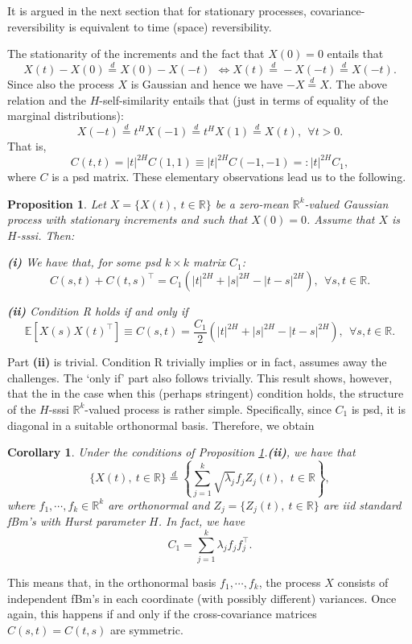 \documentclass[11pt]{article}
\def\E{\mathbb E}
\def\R{\mathbb R}
\def\eqd{\stackrel{d}{=}}
\theoremstyle{plain}
\newtheorem{corollary}[theorem]{Corollary}
\newtheorem{proposition}[theorem]{Proposition}
\theoremstyle{definition}
\theoremstyle{condition}
\theoremstyle{remark}
\begin{document}
It is argued in the next section that for stationary processes, covariance-reversibility is equivalent to time (space) reversibility.

\medskip
The stationarity of the increments and the fact that $X(0)=0$ entails that 
$$
X(t) - X(0) \eqd X(0) - X(-t) \ \ \Leftrightarrow X(t) \eqd -X(-t) \eqd X(-t).
$$
Since also the process $X$ is Gaussian and hence we have $-X\eqd X$.  The above relation and the
$H$-self-similarity entails that (just in terms of equality of the marginal distributions):
$$
X(-t) \eqd t^H X(-1) \eqd t^H X(1) \eqd X(t),\ \ \forall t>0. 
$$
That is, 
$$
C(t,t) = |t|^{2H} C(1,1) \equiv |t|^{2H} C(-1,-1) =: |t|^{2H} C_1,
$$
where $C$ is a psd matrix.  These elementary observations lead us to the following.

\begin{proposition}\label{p:basic} Let $X = \{X(t),\ t\in\R\}$ be a zero-mean $\R^k$-valued Gaussian process with stationary increments and such that $X(0)=0$.
Assume that $X$ is $H$-sssi.  Then:

{\bf (i)} We have that, for some psd $k\times k$ matrix $C_1$: 
$$
C(s,t) + C(t,s)^\top = C_1  \left( |t|^{2H} + | s|^{2H} - |t-s|^{2H} \right),\ \ \forall s,t\in\R.
$$

{\bf (ii)} Condition R holds if and only if
$$
\E [ X(s)X(t)^\top]  \equiv C(s,t) = \frac{C_1}{2}  \left( |t|^{2H} + | s|^{2H} - |t-s|^{2H} \right),\ \ \forall s,t\in\R.
$$
\end{proposition}

Part {\bf (ii)} is trivial. Condition R trivially implies or in fact, assumes away the challenges.  The `only if' part also follows trivially. This result 
shows, however, that the in the case when this (perhaps stringent) condition holds, the structure of the $H$-sssi $\R^k$-valued process is 
rather simple.  Specifically, since $C_1$ is psd, it is diagonal in a suitable orthonormal basis.  Therefore, we obtain

\begin{corollary} Under the conditions of Proposition \ref{p:basic}.{\bf (ii)}, we have that 
$$
\{X(t),\ t\in\R\} \eqd \left\{ \sum_{j=1}^k \sqrt{\lambda_j} f_j Z_j(t),\ \ t\in\R\right\},
$$
where $f_1,\cdots,f_k\in\R^k$ are orthonormal and $Z_j = \{Z_j(t),\ t\in\R\}$ are iid standard fBm's with Hurst parameter $H$.  In fact, we have
$$
C_1 = \sum_{j=1}^k \lambda_j f_j f_j^\top.
$$
\end{corollary}

This means that, in the orthonormal basis $f_1,\cdots,f_k$, the process $X$ consists of independent fBm's in each coordinate (with possibly different) variances.
Once again, this happens if and only if the cross-covariance matrices $C(s,t)=C(t,s)$ are symmetric.
\end{document}
